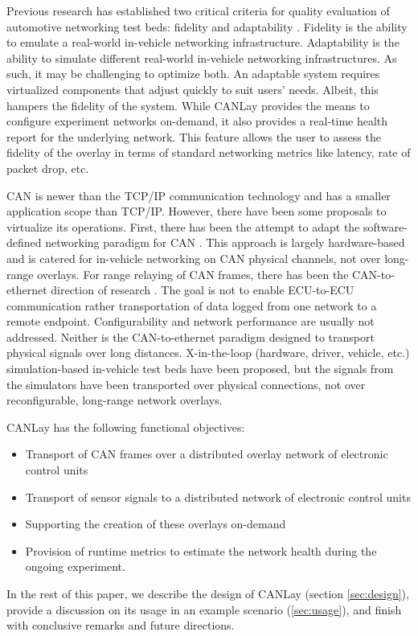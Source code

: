 \documentclass[letterpaper,twocolumn,12pt]{article}
\begin{document}
Previous research has established two critical criteria for quality evaluation of automotive networking test beds: fidelity and adaptability \cite{tagarev_automotive_2021}. 
Fidelity is the ability to emulate a real-world in-vehicle networking infrastructure. 
Adaptability is the ability to simulate different real-world in-vehicle networking infrastructures. 
As such, it may be challenging to optimize both. 
An adaptable system requires virtualized components that adjust quickly to suit users' needs. 
Albeit, this hampers the fidelity of the system. 
While CANLay provides the means to configure experiment networks on-demand, it also provides a real-time health report for the underlying network. 
This feature allows the user to assess the fidelity of the overlay in terms of standard networking metrics like latency, rate of packet drop, etc.


CAN is newer than the TCP/IP communication technology and has a smaller application scope than TCP/IP. 
However, there have been some proposals to virtualize its operations. 
First, there has been the attempt to adapt the software-defined networking paradigm for CAN \cite{rotermund_requirements_2020,doering_retrofitting_nodate,grewe_bloomycan_2021}. This approach is largely hardware-based and is catered for in-vehicle networking on CAN physical channels, not over long-range overlays. For range relaying of CAN frames, there has been the CAN-to-ethernet direction of research \cite{johanson_relaying_2009,florian_polzlbauer_experience_2019}. 
The goal is not to enable ECU-to-ECU communication rather transportation of data logged from one network to a remote endpoint. 
Configurability and network performance are usually not addressed. Neither is the CAN-to-ethernet paradigm designed to transport physical signals over long distances. 
X-in-the-loop (hardware, driver, vehicle, etc.) simulation-based in-vehicle test beds \cite{appel_safety_2020} have been proposed, but the signals from the simulators have been transported over physical connections, not over reconfigurable, long-range network overlays. 

CANLay has the following functional objectives:
\begin{itemize}
    \item Transport of CAN frames over a distributed overlay network of electronic control units
    \item Transport of sensor signals to a distributed network of electronic control units
    \item Supporting the creation of these overlays on-demand
    \item Provision of runtime metrics to estimate the network health during the ongoing experiment.
\end{itemize}
In the rest of this paper, we describe the design of CANLay (section \ref{sec:design}), provide a discussion on its usage in an example scenario (\ref{sec:usage}), and finish with conclusive remarks and future directions.
\end{document}
